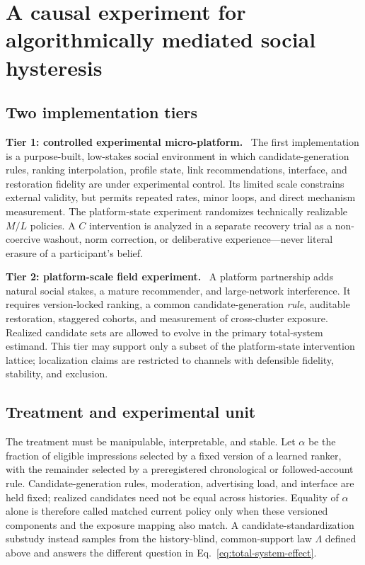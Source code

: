 \documentclass[pdflatex,sn-mathphys-num]{sn-jnl}
\newcommand{\inlinehead}[1]{\par\smallskip\noindent\textbf{#1}\ }
\begin{document}
\section{A causal experiment for algorithmically mediated social hysteresis}

\subsection{Two implementation tiers}

\inlinehead{Tier 1: controlled experimental micro-platform.} The first implementation is a purpose-built, low-stakes social environment in which candidate-generation rules, ranking interpolation, profile state, link recommendations, interface, and restoration fidelity are under experimental control. Its limited scale constrains external validity, but permits repeated rates, minor loops, and direct mechanism measurement. The platform-state experiment randomizes technically realizable $M/L$ policies. A $C$ intervention is analyzed in a separate recovery trial as a non-coercive washout, norm correction, or deliberative experience---never literal erasure of a participant's belief.

\inlinehead{Tier 2: platform-scale field experiment.} A platform partnership adds natural social stakes, a mature recommender, and large-network interference. It requires version-locked ranking, a common candidate-generation \emph{rule}, auditable restoration, staggered cohorts, and measurement of cross-cluster exposure. Realized candidate sets are allowed to evolve in the primary total-system estimand. This tier may support only a subset of the platform-state intervention lattice; localization claims are restricted to channels with defensible fidelity, stability, and exclusion.

\subsection{Treatment and experimental unit}

The treatment must be manipulable, interpretable, and stable. Let $\alpha$ be the fraction of eligible impressions selected by a fixed version of a learned ranker, with the remainder selected by a preregistered chronological or followed-account rule. Candidate-generation rules, moderation, advertising load, and interface are held fixed; realized candidates need not be equal across histories. Equality of $\alpha$ alone is therefore called matched current policy only when these versioned components and the exposure mapping also match. A candidate-standardization substudy instead samples from the history-blind, common-support law $\Lambda$ defined above and answers the different question in Eq.~\eqref{eq:total-system-effect}.
\end{document}
